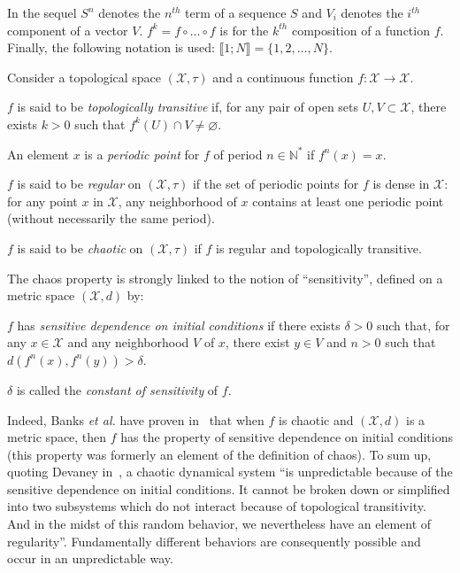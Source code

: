 \documentclass{article}
\begin{document}
In the sequel $S^{n}$ denotes the $n^{th}$ term of a sequence $S$ and $V_{i}$
denotes the $i^{th}$ component of a vector $V$. $f^{k}=f\circ ...\circ f$
is for the $k^{th}$ composition of a function $f$. Finally, the following
notation is used: $\llbracket1;N\rrbracket=\{1,2,\hdots,N\}$.


Consider a topological space $(\mathcal{X},\tau)$ and a continuous function $f :
\mathcal{X} \rightarrow \mathcal{X}$.

\begin{definition}
$f$ is said to be \emph{topologically transitive} if, for any pair of open sets
$U,V \subset \mathcal{X}$, there exists $k>0$ such that $f^k(U) \cap V \neq
\varnothing$.
\end{definition}

\begin{definition}
An element $x$ is a \emph{periodic point} for $f$ of period $n\in \mathds{N}^*$
if $f^{n}(x)=x$.\end{definition}

\begin{definition}
$f$ is said to be \emph{regular} on $(\mathcal{X}, \tau)$ if the set of periodic
points for $f$ is dense in $\mathcal{X}$: for any point $x$ in $\mathcal{X}$,
any neighborhood of $x$ contains at least one periodic point (without
necessarily the same period).
\end{definition}


\begin{definition}
$f$ is said to be \emph{chaotic} on $(\mathcal{X},\tau)$ if $f$ is regular and
topologically transitive.
\end{definition}

The chaos property is strongly linked to the notion of ``sensitivity'', defined
on a metric space $(\mathcal{X},d)$ by:

\begin{definition}
\label{sensitivity} $f$ has \emph{sensitive dependence on initial conditions}
if there exists $\delta >0$ such that, for any $x\in \mathcal{X}$ and any
neighborhood $V$ of $x$, there exist $y\in V$ and $n > 0$ such that
$d\left(f^{n}(x), f^{n}(y)\right) >\delta $.

$\delta$ is called the \emph{constant of sensitivity} of $f$.
\end{definition}

Indeed, Banks \emph{et al.} have proven in~\cite{Banks92} that when $f$ is
chaotic and $(\mathcal{X}, d)$ is a metric space, then $f$ has the property of
sensitive dependence on initial conditions (this property was formerly an
element of the definition of chaos). To sum up, quoting Devaney
in~\cite{Devaney}, a chaotic dynamical system ``is unpredictable because of the
sensitive dependence on initial conditions. It cannot be broken down or
simplified into two subsystems which do not interact because of topological
transitivity. And in the midst of this random behavior, we nevertheless have an
element of regularity''. Fundamentally different behaviors are consequently
possible and occur in an unpredictable way.
\end{document}
